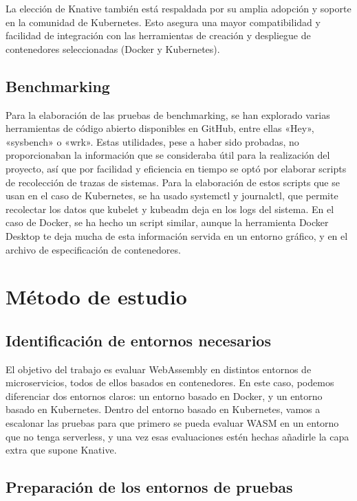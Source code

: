 La elección de Knative también está respaldada por su amplia adopción y soporte en la comunidad de Kubernetes. Esto asegura una mayor compatibilidad y facilidad de integración con las herramientas de creación y despliegue de contenedores seleccionadas (Docker y Kubernetes).

\subsection{Benchmarking}

Para la elaboración de las pruebas de benchmarking, se han explorado varias herramientas de código abierto disponibles en GitHub, entre ellas «Hey», «sysbench» o «wrk». Estas utilidades, pese a haber sido probadas, no proporcionaban la información que se consideraba útil para la realización del proyecto, así que por facilidad y eficiencia en tiempo se optó por elaborar scripts de recolección de trazas de sistemas. Para la elaboración de estos scripts que se usan en el caso de Kubernetes, se ha usado systemctl y journalctl, que permite recolectar los datos que kubelet y kubeadm deja en los logs del sistema. En el caso de Docker, se ha hecho un script similar, aunque la herramienta Docker Desktop te deja mucha de esta información servida en un entorno gráfico, y en el archivo de especificación de contenedores. 

\section{Método de estudio}

\subsection{Identificación de entornos necesarios}

El objetivo del trabajo es evaluar WebAssembly en distintos entornos de microservicios, todos de ellos basados en contenedores. En este caso, podemos diferenciar dos entornos claros: un entorno basado en Docker, y un entorno basado en Kubernetes. Dentro del entorno basado en Kubernetes, vamos a escalonar las pruebas para que primero se pueda evaluar WASM en un entorno que no tenga serverless, y una vez esas evaluaciones estén hechas añadirle la capa extra que supone Knative.

\subsection{Preparación de los entornos de pruebas}

